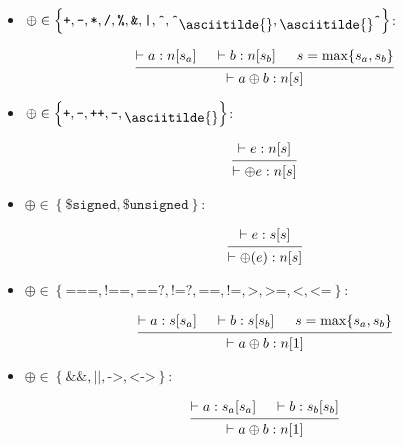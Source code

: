 \documentclass{article}
\newcommand{\mytilde}{\raisebox{-.7ex}{\asciitilde{}}}
\newcommand{\binOp}{\ensuremath{\left\{
      \texttt{+}, \texttt{-}, \texttt{*}, \texttt{/}, \texttt{\%}, \texttt{\&},
      \texttt{|}, \texttt{\^{}}, \texttt{\^{}}\mytilde, \mytilde\texttt{\^{}}
      \right\}}}
\newcommand{\unOp}{\ensuremath{\left\{
      \texttt{+}, \texttt{-}, \texttt{++}, \texttt{--}, \mytilde
    \right\}}}
\newcommand{\cast}{\ensuremath{\left\{\texttt{\$signed}, \texttt{\$unsigned}\right\}}}
\newcommand{\comp}{\ensuremath{\left\{
      \texttt{===}, \texttt{!==}, \texttt{==?}, \texttt{!=?}, \texttt{==},
      \texttt{!=}, \texttt{>}, \texttt{>=}, \texttt{<}, \texttt{<=}
    \right\}}}
\newcommand{\logic}{\ensuremath{\left\{\texttt{\&\&}, \texttt{||}, \texttt{->}, \texttt{<->}\right\}}}
\newcommand{\type}[3]{\vdash#2:#1[#3]}
\begin{document}
\begin{itemize}[leftmargin=*]
    \setlength{\itemsep}{2em}

    \item $\oplus \in \binOp$:

          \begin{equation*}
              \begin{prooftree}
                  \hypo{\type{n}{a}{s_a}}
                  \hypo{\type{n}{b}{s_b}}
                  \hypo{s = \max\{s_a, s_b\}}
                  \infer3{\type{n}{a \oplus b}{s}}
              \end{prooftree}
          \end{equation*}

    \item $\oplus \in \unOp$:

          \begin{equation*}
              \begin{prooftree}
                  \hypo{\type{n}{e}{s}}
                  \infer1{\type{n}{\oplus e}{s}}
              \end{prooftree}
          \end{equation*}

    \item $\oplus \in \cast$:

          \begin{equation*}
              \begin{prooftree}
                  \hypo{\type{s}{e}{s}}
                  \infer1{\type{n}{\oplus(e)}{s}}
              \end{prooftree}
          \end{equation*}

    \item $\oplus \in \comp$:

          \begin{equation*}
              \begin{prooftree}
                  \hypo{\type{s}{a}{s_a}}
                  \hypo{\type{s}{b}{s_b}}
                  \hypo{s = \max\{s_a, s_b\}}
                  \infer3{\type{n}{a \oplus b}{1}}
              \end{prooftree}
          \end{equation*}

    \item $\oplus \in \logic$:

          \begin{equation*}
              \begin{prooftree}
                  \hypo{\type{s_a}{a}{s_a}}
                  \hypo{\type{s_b}{b}{s_b}}
                  \infer2{\type{n}{a \oplus b}{1}}
              \end{prooftree}
          \end{equation*}


\end{itemize}
\end{document}
